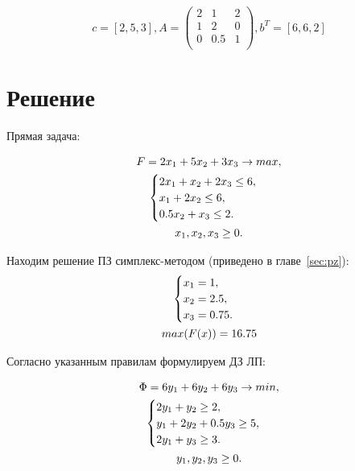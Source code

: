 \documentclass[12pt,a4paper,oneside]{extarticle}
\begin{document}
    $$c = [2, 5, 3], 
    A = \begin{pmatrix}
        2 & 1 & 2\\
        1 & 2 & 0\\
        0 & 0.5 & 1\\
    \end{pmatrix}, 
    b^T = [6, 6, 2]$$


\section{Решение}
    Прямая задача:

    \begin{gather}
        F = 2x_1+5x_2+3x_3 \rightarrow max,  \notag  \\
        \begin{cases}
            2x_1 + x_2 + 2x_3 \leq 6, \\
            x_1 + 2x_2 \leq 6, \\
            0.5x_2 + x_3 \leq 2.
        \end{cases} \notag \\
        x_1, x_2, x_3 \geq 0. \notag
    \end{gather} 

    Находим решение ПЗ симплекс-методом (приведено в главе~\ref{sec:pz}):
    \begin{gather}
        \begin{cases}
            x_1 = 1,\\
            x_2 = 2.5, \\
            x_3 = 0.75. \\
        \end{cases} \notag \\
        max (F(x)) = 16.75 \notag 
    \end{gather}

    Согласно указанным правилам формулируем ДЗ ЛП:

    \begin{gather}
        \Phi = 6y_1 + 6y_2 + 6y_3 \rightarrow min,  \notag  \\
        \begin{cases}
            2y_1 + y_2 \geq 2, \\
            y_1 + 2y_2 + 0.5y_3 \geq 5, \\
            2y_1 + y_3 \geq 3.
        \end{cases} \notag \\
        y_1, y_2, y_3 \geq 0. \notag
    \end{gather} 
\end{document}
